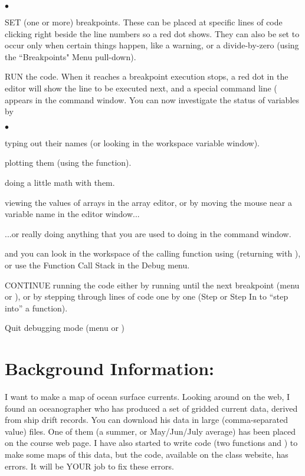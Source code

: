\documentclass[letterpaper,12pt]{article}
\newcounter{lnum}
\newenvironment{abbrevlist}%
  {\begin{list}{$\bullet$}{\setlength{\leftmargin}{2em}%
               \setlength{\itemindent}{0em}%
               \setlength{\itemsep}{0pt}%
               \setlength{\parsep}{0pt}%
               \setlength{\topsep}{2pt}%
               \usecounter{lnum} } }{\end{list}}
\begin{document}
\begin{abbrevlist}
\item SET (one or more) breakpoints. These can be placed at specific lines of code clicking right beside
the line numbers so a red dot shows. They can also be set to occur only when certain things happen, like a warning, or a divide-by-zero (using the ``Breakpoints" Menu pull-down).
\item RUN the code. When it reaches a breakpoint execution stops, a red dot in the editor will
show the line to be executed next, and a special command line
( appears in the command window. You can now
investigate the status of variables by 
\begin{abbrevlist}
\item typing out their names (or looking in the workspace variable window).
\item plotting them (using the  function).
\item doing a little math with them.
\item viewing the values of arrays in the array editor, or by moving the mouse near a variable name in the editor window...
\item ...or really doing anything that you are used to doing in the command window.
\item and you can look in the workspace of the calling function using  (returning with
), or use the Function Call Stack in the Debug menu.
\end{abbrevlist}
\item CONTINUE running the code either by running until the next breakpoint (menu or ), or by stepping
through lines of code one by one (Step or Step In to ``step into'' a function).
\item Quit debugging mode (menu or )
\end{abbrevlist}

\newpage

\section*{Background Information:}
\vspace{-12pt}

I want to make a map of ocean surface currents. Looking around on the web, I found
an oceanographer who has produced a set of gridded current data, derived from ship drift
records. You can download his data in large  (comma-separated value)
files. One of them  (a summer, or May/Jun/July average) has been placed on the course web 
page. I have also started to write code (two functions  and ) 
to make some maps of this data, but the code, available on the class website, has errors.
It will be YOUR job to fix these errors.
\end{document}
